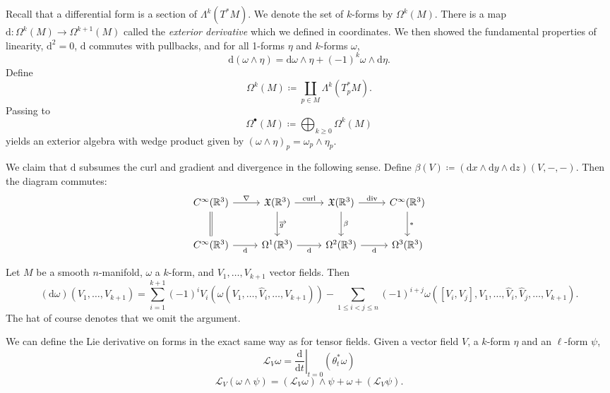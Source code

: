 
Recall that a differential form is a section of $\Lambda ^k(T^*M)$. We denote the set of $k$-forms by $\Omega ^k(M)$. There is a map $\mathrm{d} : \Omega ^k(M) \to \Omega ^{k+1} (M)$ called the \emph{exterior derivative} which we defined in coordinates. We then showed the fundamental properties of linearity, $\mathrm{d} ^2=0$, $\mathrm{d}$ commutes with pullbacks, and for all 1-forms $\eta $ and $k$-forms $\omega $,
\[
	\mathrm{d} (\omega \wedge \eta )=\mathrm{d} \omega \wedge \eta +\left( -1 \right) ^k \omega \wedge \mathrm{d} \eta 
.\]
Define
\[
	\Omega ^k(M) \coloneqq \coprod_{p\in M} \Lambda ^k(T_p^*M)
.\]
Passing to
\[
	\Omega ^{\bullet} (M) \coloneqq \bigoplus_{k\geq 0} \Omega ^k(M)
\]
yields an exterior algebra with wedge product given by $(\omega \wedge \eta )_p=\omega _p \wedge \eta_p$.

We claim that $\mathrm{d} $ subsumes the curl and gradient and divergence in the following sense. Define $\beta (V)\coloneqq (\mathrm{d} x \wedge \mathrm{d} y \wedge \mathrm{d} z)(V,-,-)$. Then the diagram commutes:
\[\begin{tikzcd}[row sep = 2.5em, column sep = 2.5em]
	C^\infty (\mathbb{R} ^3)\ar[" \nabla  ", r] \ar[equals, d]  & \mathfrak{X}(\mathbb{R} ^3)\ar[" \mathrm{curl}  ", r] \ar[" \overline{g} ^\flat ", d]  & \mathfrak{X} (\mathbb{R} ^3)\ar[" \beta  ", d] \ar[" \mathrm{div}  ", r]  & C^\infty (\mathbb{R} ^3)\ar[" * ", d]  \\
C^\infty (\mathbb{R} ^3)\ar[" \mathrm{d}  "', r]  & \Omega ^1(\mathbb{R} ^3)\ar[" \mathrm{d}  "', r]  & \Omega ^2(\mathbb{R} ^3)\ar[" \mathrm{d}  "', r]  & \Omega ^3(\mathbb{R} ^3)
\end{tikzcd}\]


\begin{proposition}\label{awooo}
	Let $M$ be a smooth $n$-manifold, $\omega $ a $k$-form, and $V_1, \ldots ,V_{k+1} $ vector fields. Then
	\[
		(\mathrm{d} \omega )(V_1, \ldots ,V_{k+1} ) = \sum_{i=1}^{k+1} (-1)^iV_i(\omega (V_1, \ldots ,\hat{V} _i , \ldots ,V_{k+1} )) - \sum_{1\leq i<j\leq n} (-1)^{i+j} \omega ([V_i,V_j],V_1, \ldots ,\hat{V} _i,\hat{V} _j, \ldots ,V_{k+1} )
	.\]
	The hat of course denotes that we omit the argument.
\end{proposition}

We can define the Lie derivative on forms in the exact same way as for tensor fields. Given a vector field $V$, a $k$-form $\eta $ and an $\ell $-form $\psi $,
\[
	\mathcal{L} _V\omega =\left.\frac{\mathrm{d}}{\mathrm{d}t}\right|_{t=0} (\theta _t^*\omega )
\]
\[
	\mathcal{L} _V(\omega \wedge \psi )=(\mathcal{L} _V\omega )\wedge \psi +\omega +(\mathcal{L} _V\psi )
.\]

